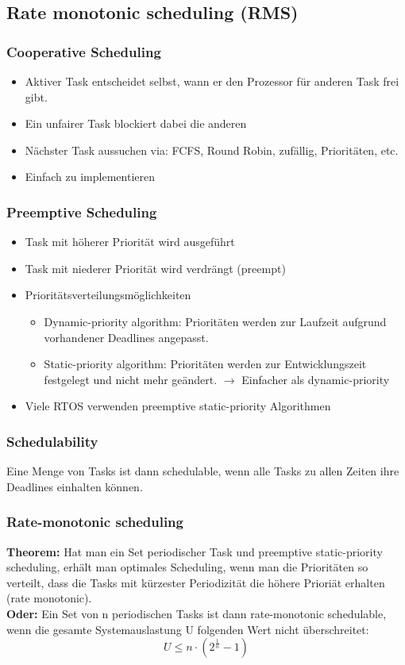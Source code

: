 \subsection{Rate monotonic scheduling (RMS)}
\subsubsection{Cooperative Scheduling}
  \begin{itemize}
    \item Aktiver Task entscheidet selbst, wann er den Prozessor für anderen
    Task frei gibt. 
    \item Ein unfairer Task blockiert dabei die anderen
    \item Nächster Task aussuchen via: FCFS, Round Robin, zufällig, Prioritäten, etc.
    \item Einfach zu implementieren
  \end{itemize}
\subsubsection{Preemptive Scheduling}
  \begin{itemize}
    \item Task mit höherer Priorität wird ausgeführt
    \item Task mit niederer Priorität wird verdrängt (preempt)
    \item Prioritätsverteilungsmöglichkeiten
      \begin{itemize}
        \item Dynamic-priority algorithm: Prioritäten werden zur Laufzeit
        aufgrund vorhandener Deadlines angepasst. 
        \item Static-priority algorithm: Prioritäten werden zur Entwicklungszeit
        festgelegt und nicht mehr geändert. $\rightarrow$ Einfacher als dynamic-priority
      \end{itemize}
    \item Viele RTOS verwenden preemptive static-priority Algorithmen 
  \end{itemize}
\subsubsection{Schedulability}
 Eine Menge von Tasks ist dann schedulable, wenn alle Tasks zu allen Zeiten ihre Deadlines einhalten können.
\subsubsection{Rate-monotonic scheduling}
\textbf{Theorem:} 
Hat man ein Set periodischer Task und preemptive static-priority scheduling,
erhält man optimales Scheduling, wenn man die Prioritäten so verteilt, dass die
Tasks mit kürzester Periodizität die höhere Prioriät erhalten (rate
monotonic).\\
\textbf{Oder:}
Ein Set von n periodischen Tasks ist dann rate-monotonic schedulable, wenn die gesamte Systemauslastung U folgenden Wert nicht überschreitet: 
\begin{equation}
U \leq n\cdot(2^\frac{1}{n}-1)
\end{equation}\\

